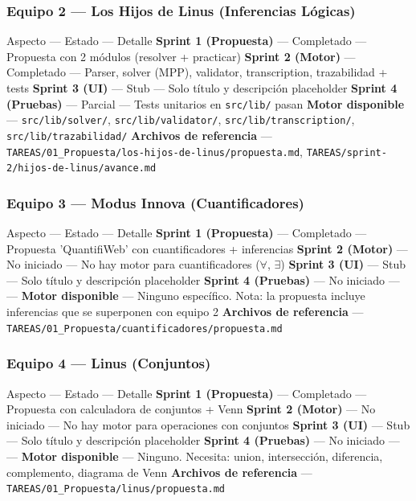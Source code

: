 \documentclass[11pt,a4paper,openany]{book}
\begin{document}
\subsubsection{Equipo 2 --- Los Hijos de Linus (Inferencias Lógicas)}
Aspecto --- Estado --- Detalle
\textbf{Sprint 1 (Propuesta)} --- Completado --- Propuesta con 2 módulos (resolver + practicar)
\textbf{Sprint 2 (Motor)} --- Completado --- Parser, solver (MPP), validator, transcription, trazabilidad + tests
\textbf{Sprint 3 (UI)} --- Stub --- Solo título y descripción placeholder
\textbf{Sprint 4 (Pruebas)} --- Parcial --- Tests unitarios en \texttt{src/lib/} pasan
\textbf{Motor disponible} --- \texttt{src/lib/solver/}, \texttt{src/lib/validator/}, \texttt{src/lib/transcription/}, \texttt{src/lib/trazabilidad/}
\textbf{Archivos de referencia} --- \texttt{TAREAS/01\_Propuesta/los-hijos-de-linus/propuesta.md}, \texttt{TAREAS/sprint-2/hijos-de-linus/avance.md}

\subsubsection{Equipo 3 --- Modus Innova (Cuantificadores)}
Aspecto --- Estado --- Detalle
\textbf{Sprint 1 (Propuesta)} --- Completado --- Propuesta 'QuantifiWeb' con cuantificadores + inferencias
\textbf{Sprint 2 (Motor)} --- No iniciado --- No hay motor para cuantificadores ($ \forall $, $ \exists $)
\textbf{Sprint 3 (UI)} --- Stub --- Solo título y descripción placeholder
\textbf{Sprint 4 (Pruebas)} --- No iniciado --- ---
\textbf{Motor disponible} --- Ninguno específico. Nota: la propuesta incluye inferencias que se superponen con equipo 2
\textbf{Archivos de referencia} --- \texttt{TAREAS/01\_Propuesta/cuantificadores/propuesta.md}

\subsubsection{Equipo 4 --- Linus (Conjuntos)}
Aspecto --- Estado --- Detalle
\textbf{Sprint 1 (Propuesta)} --- Completado --- Propuesta con calculadora de conjuntos + Venn
\textbf{Sprint 2 (Motor)} --- No iniciado --- No hay motor para operaciones con conjuntos
\textbf{Sprint 3 (UI)} --- Stub --- Solo título y descripción placeholder
\textbf{Sprint 4 (Pruebas)} --- No iniciado --- ---
\textbf{Motor disponible} --- Ninguno. Necesita: union, intersección, diferencia, complemento, diagrama de Venn
\textbf{Archivos de referencia} --- \texttt{TAREAS/01\_Propuesta/linus/propuesta.md}
\end{document}
